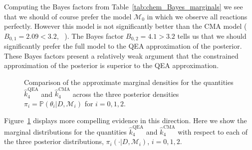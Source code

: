 \documentclass[final]{siamltex}
\begin{document}
Computing the Bayes factors from Table~\ref{tab:chem_Bayes_marginals}
we see that we should of course prefer the model $\mathcal{M}_0$ in
which we observe all reactions perfectly. However this model is not
significantly better than the CMA model ($B_{0,1} = 2.09 < 3.2$,
~\cite{kass1995bayes}). The Bayes factor $B_{0,2} = 4.1 > 3.2$ tells
us that we should significantly prefer the full model to the QEA
approximation of the posterior. These Bayes factors present a
relatively weak
argument that the constrained approximation of the posterior is
superior to the QEA approximation. 

\begin{figure}[!htb]
\centering
{}
\caption{Comparison of the approximate marginal densities for the
  quantities $\hat{k}_4^{\text{QEA}}$ and $\hat{k}_4^{\text{CMA}}$
  across the three posterior densities $\pi_i = \mathbb{P}(\theta_i|D,\mathcal{M}_i)$ for $i = 0, 1, 2$.}
\label{fig:chem_model_comp}
\end{figure}

Figure~\ref{fig:chem_model_comp} displays more compelling evidence in
this direction. Here we show the marginal distributions for the
quantities $\hat{k}_4^{\text{QEA}}$ and $\hat{k}_4^{\text{CMA}}$ with
respect to each of the three posterior distributions, $\pi_i(\cdot|D,
\mathcal{M}_i)$, $i = 0, 1, 2$.  
\end{document}
